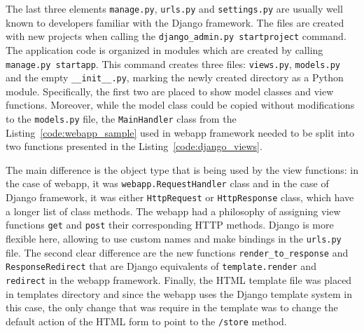 The last three elements \texttt{manage.py}, \texttt{urls.py} and \texttt{settings.py} are usually well known to developers familiar with the Django framework. The files are created with new projects when calling the \texttt{django\_admin.py startproject} command. The application code is organized in modules which are created by calling \texttt{manage.py startapp}. This command creates three files: \texttt{views.py}, \texttt{models.py} and the empty \texttt{\_\_init\_\_.py}, marking the newly created directory as a Python module. Specifically, the first two are placed to show model classes and view functions. Moreover, while the model class could be copied without modifications to the \texttt{models.py} file, the \texttt{MainHandler} class from the Listing~\ref{code:webapp_sample} used in webapp framework needed to be split into two functions presented in the Listing~\ref{code:django_views}.


The main difference is the object type that is being used by the view functions: in the case of webapp, it was \texttt{webapp.RequestHandler} class and in the case of Django framework, it was either \texttt{HttpRequest} or \texttt{HttpResponse} class, which have a longer list of class methods. The webapp had a philosophy of assigning view functions \texttt{get} and \texttt{post} their corresponding HTTP methods. Django is more flexible here, allowing to use custom names and make bindings in the \texttt{urls.py} file. The second clear difference are the new functions \texttt{render\_to\_response} and \linebreak \texttt{ResponseRedirect} that are Django equivalents of \texttt{template.render} and \texttt{redirect} in the webapp framework. Finally, the HTML template file  was placed in templates directory and since the webapp uses the Django template system in this case, the only change that was require in the template was to change the default action of the HTML form to point to the \texttt{/store} method.

